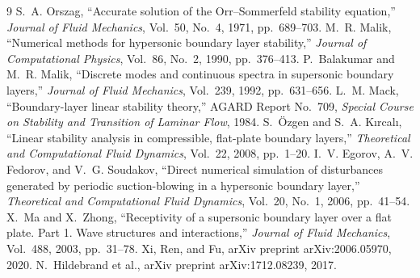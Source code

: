 \documentclass[11pt]{article}
\begin{document}
\begin{thebibliography}{9}
 S.~A. Orszag, ``Accurate solution of the Orr--Sommerfeld stability
  equation,'' \emph{Journal of Fluid Mechanics}, Vol.~50, No.~4, 1971, pp.~689--703.
 M.~R. Malik, ``Numerical methods for hypersonic boundary layer stability,''
  \emph{Journal of Computational Physics}, Vol.~86, No.~2, 1990, pp.~376--413.
 P.~Balakumar and M.~R. Malik, ``Discrete modes and continuous spectra in
  supersonic boundary layers,'' \emph{Journal of Fluid Mechanics}, Vol.~239, 1992, pp.~631--656.
 L.~M. Mack, ``Boundary-layer linear stability theory,'' AGARD Report No.~709,
  \emph{Special Course on Stability and Transition of Laminar Flow}, 1984.
 S.~\"Ozgen and S.~A. K{\i}rcal{\i}, ``Linear stability analysis in
  compressible, flat-plate boundary layers,'' \emph{Theoretical and Computational Fluid Dynamics},
  Vol.~22, 2008, pp.~1--20.
 I.~V. Egorov, A.~V. Fedorov, and V.~G. Soudakov, ``Direct numerical
  simulation of disturbances generated by periodic suction-blowing in a hypersonic boundary
  layer,'' \emph{Theoretical and Computational Fluid Dynamics}, Vol.~20, No.~1, 2006, pp.~41--54.
 X.~Ma and X.~Zhong, ``Receptivity of a supersonic boundary layer over a flat
  plate. Part 1. Wave structures and interactions,'' \emph{Journal of Fluid Mechanics}, Vol.~488,
  2003, pp.~31--78.
 Xi, Ren, and Fu, arXiv preprint arXiv:2006.05970, 2020.
 N.~Hildebrand et al., arXiv preprint arXiv:1712.08239, 2017.
\end{thebibliography}
\end{document}
